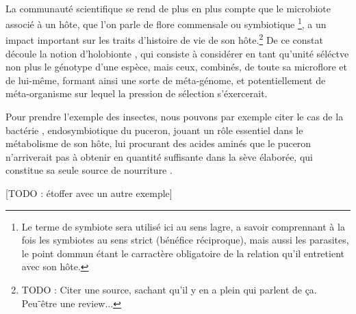 
\paragraph{} %
\label{par:intro1}

La communauté scientifique se rend de plus en plus compte que le microbiote
associé à un hôte, que l'on parle de flore commensale ou symbiotique
\footnote{Le terme de symbiote sera utilisé ici au sens lagre, a savoir
comprennant à la fois les symbiotes au sens strict (bénéfice réciproque), mais
aussi les parasites, le point dommun étant le carractère obligatoire de la
relation qu'il entretient avec son hôte.}, a un impact important sur les
traits d'histoire de vie de son hôte.\footnote{TODO : Citer une source,
sachant qu'il y en a plein qui parlent de ça. Peu⁻être une review...} De ce
constat découle la notion d'holobionte \cite{rosenberg2007}, qui consiste à
considérer en tant qu'unité séléctve non plus le génotype d'une espèce, mais
ceux, combinés, de toute sa microflore et de lui-même, formant ainsi une sorte
de méta-génome, et potentiellement de méta-organisme sur lequel la pression de
sélection s'éxercerait.

Pour prendre l'exemple des insectes, nous pouvons par exemple citer le cas de
la bactérie ,  endosymbiotique du puceron, jouant un rôle
essentiel dans le métabolisme de son hôte, lui procurant des acides aminés que
le puceron n'arriverait pas à obtenir en quantité suffisante dans la sève
élaborée, qui constitue sa seule source de nourriture \cite{douglas1998}.

[TODO : étoffer avec un autre exemple]



